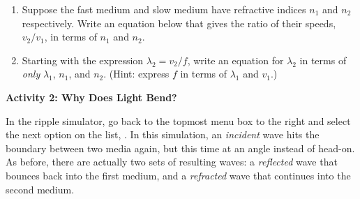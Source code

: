 \begin{enumerate}[labparts]
\item Suppose the fast medium and slow medium have  refractive indices $n_1$ and $n_2$ respectively.  Write an equation below that gives the ratio of their speeds, $v_2/v_1$, in terms of $n_1$ and $n_2$.
\answerspace{0.5in}

\item Starting with the expression $\lambda_2=v_2/f$, write an equation for $\lambda_2$ in terms of \textit{only} $\lambda_1$, $n_1$, and $n_2$.  (Hint: express $f$ in terms of $\lambda_1$ and $v_1$.) \label{part_ratio_of_lambdas}
\answerspace{1.0in}

\end{enumerate}
\textbf{Activity 2: Why Does Light Bend?}

In the ripple simulator, go back to the topmost menu box to the right and select the next option on the list, .  In this simulation, an \textit{incident} wave hits the boundary between two media again, but this time at an angle instead of head-on.  As before, there are actually two sets of resulting waves: a \textit{reflected} wave that bounces back into the first medium, and a \textit{refracted} wave that continues into the second medium. 

